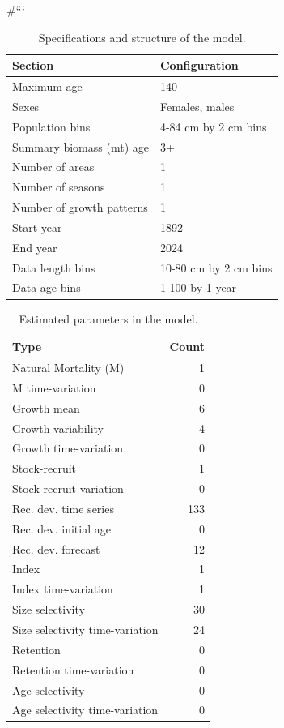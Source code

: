 \documentclass[
]{scrartcl}
\begin{document}
\#```

\pagebreak

\begingroup
\fontsize{9.0pt}{10.8pt}\selectfont

\begin{longtable}{ll}

\caption{\label{tbl-model-config}Specifications and structure of the
model.}

\tabularnewline

\toprule
Section & Configuration \\ 
\midrule\addlinespace[2.5pt]
Maximum age & 140 \\ 
Sexes & Females, males \\ 
Population bins & 4-84 cm by 2 cm bins \\ 
Summary biomass (mt) age & 3+ \\ 
Number of areas & 1 \\ 
Number of seasons & 1 \\ 
Number of growth patterns & 1 \\ 
Start year & 1892 \\ 
End year & 2024 \\ 
Data length bins & 10-80 cm by 2 cm bins \\ 
Data age bins & 1-100 by 1 year \\ 
\bottomrule

\end{longtable}

\endgroup

\begingroup
\fontsize{9.0pt}{10.8pt}\selectfont

\begin{longtable}{lr}

\caption{\label{tbl-n-param}Estimated parameters in the model.}

\tabularnewline

\toprule
Type & Count \\ 
\midrule\addlinespace[2.5pt]
Natural Mortality (M) & 1 \\ 
M time-variation & 0 \\ 
Growth mean & 6 \\ 
Growth variability & 4 \\ 
Growth time-variation & 0 \\ 
Stock-recruit & 1 \\ 
Stock-recruit variation & 0 \\ 
Rec. dev. time series & 133 \\ 
Rec. dev. initial age & 0 \\ 
Rec. dev. forecast & 12 \\ 
Index & 1 \\ 
Index time-variation & 1 \\ 
Size selectivity & 30 \\ 
Size selectivity time-variation & 24 \\ 
Retention & 0 \\ 
Retention time-variation & 0 \\ 
Age selectivity & 0 \\ 
Age selectivity time-variation & 0 \\ 
\bottomrule

\end{longtable}
\end{document}
